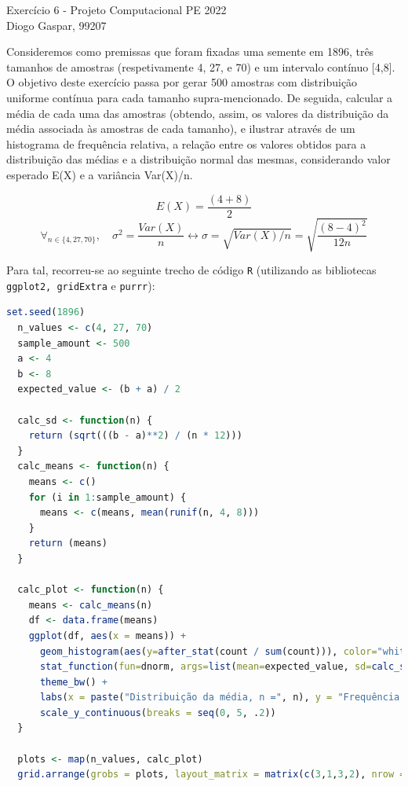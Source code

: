 \documentclass[11pt]{article}
\newcommand{\gaspar}{Diogo Gaspar, 99207}
\begin{document}
\begin{center}
{\huge{Exercício 6 - Projeto Computacional PE 2022}} \\
\vspace{1.5mm}
{\large{\gaspar}} \\
\end{center}

Consideremos como premissas que foram fixadas uma semente em 1896, três
tamanhos de amostras (respetivamente 4, 27, e 70) e um intervalo contínuo [4,8].
O objetivo deste exercício passa por gerar 500 amostras com distribuição uniforme
contínua para cada tamanho supra-mencionado. De seguida, calcular a média de cada uma
das amostras (obtendo, assim, os valores da distribuição da média associada às amostras
de cada tamanho), e ilustrar através de um histograma de frequência relativa, a
relação entre os valores obtidos para a distribuição das médias e a distribuição normal
das mesmas, considerando valor esperado E(X) e a variância Var(X)/n.

$$
E(X) = \frac{(4 + 8)}{2}
$$
$$
\forall_{n \in \{4, 27, 70\}}, \quad \sigma^2 = \frac{Var(X)}{n} \leftrightarrow \sigma = \sqrt{Var(X) / n} = \sqrt{\frac{(8 - 4)^2}{12n}}
$$

\vspace{0.5mm}
Para tal, recorreu-se ao seguinte trecho de código \texttt{R} (utilizando as bibliotecas \texttt{ggplot2, gridExtra} e \texttt{purrr}):

\begin{lstlisting}[language=R]
  set.seed(1896)
  n_values <- c(4, 27, 70)
  sample_amount <- 500
  a <- 4
  b <- 8
  expected_value <- (b + a) / 2
  
  calc_sd <- function(n) {
    return (sqrt(((b - a)**2) / (n * 12)))
  }
  calc_means <- function(n) {
    means <- c()
    for (i in 1:sample_amount) {
      means <- c(means, mean(runif(n, 4, 8)))
    }
    return (means)
  }
  
  calc_plot <- function(n) {
    means <- calc_means(n)
    df <- data.frame(means)
    ggplot(df, aes(x = means)) +
      geom_histogram(aes(y=after_stat(count / sum(count))), color="white", fill="red", bins=40) +
      stat_function(fun=dnorm, args=list(mean=expected_value, sd=calc_sd(n))) +
      theme_bw() +
      labs(x = paste("Distribuição da média, n =", n), y = "Frequência Relativa") +
      scale_y_continuous(breaks = seq(0, 5, .2))
  }
  
  plots <- map(n_values, calc_plot)
  grid.arrange(grobs = plots, layout_matrix = matrix(c(3,1,3,2), nrow = 2))
\end{lstlisting}
\end{document}
